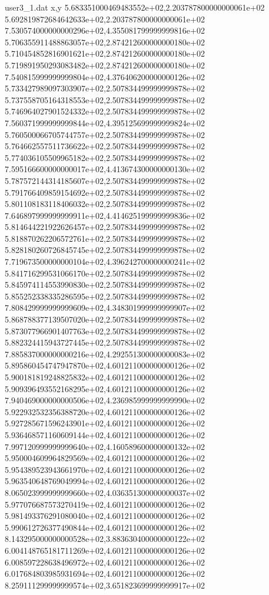 \begin{filecontents}{user3_1.dat}
x,y
5.683351000469483552e+02,2.203787800000000061e+02
5.692819872684642633e+02,2.203787800000000061e+02
7.530574000000000296e+02,4.355081799999999816e+02
5.706355911488863057e+02,2.874212600000000180e+02
5.710454852816901621e+02,2.874212600000000180e+02
5.719891950293083482e+02,2.874212600000000180e+02
7.540815999999999804e+02,4.376406200000000126e+02
5.733427989097303907e+02,2.507834499999999878e+02
5.737558705164318553e+02,2.507834499999999878e+02
5.746964027901524332e+02,2.507834499999999878e+02
7.560371999999999844e+02,4.395125699999999824e+02
5.760500066705744757e+02,2.507834499999999878e+02
5.764662557511736622e+02,2.507834499999999878e+02
5.774036105509965182e+02,2.507834499999999878e+02
7.595166600000000017e+02,4.413674300000000130e+02
5.787572144314185607e+02,2.507834499999999878e+02
5.791766409859154692e+02,2.507834499999999878e+02
5.801108183118406032e+02,2.507834499999999878e+02
7.646897999999999911e+02,4.414625199999999836e+02
5.814644221922626457e+02,2.507834499999999878e+02
5.818870262206572761e+02,2.507834499999999878e+02
5.828180260726845745e+02,2.507834499999999878e+02
7.719673500000000104e+02,4.396242700000000241e+02
5.841716299531066170e+02,2.507834499999999878e+02
5.845974114553990830e+02,2.507834499999999878e+02
5.855252338335286595e+02,2.507834499999999878e+02
7.808429999999999609e+02,4.348301999999999907e+02
5.868788377139507020e+02,2.507834499999999878e+02
5.873077966901407763e+02,2.507834499999999878e+02
5.882324415943727445e+02,2.507834499999999878e+02
7.885837000000000216e+02,4.292551300000000083e+02
5.895860454747947870e+02,4.601211000000000126e+02
5.900181819248825832e+02,4.601211000000000126e+02
5.909396493552168295e+02,4.601211000000000126e+02
7.940469000000000506e+02,4.236985999999999990e+02
5.922932532356388720e+02,4.601211000000000126e+02
5.927285671596243901e+02,4.601211000000000126e+02
5.936468571160609144e+02,4.601211000000000126e+02
7.997120999999999640e+02,4.160589600000000132e+02
5.950004609964829569e+02,4.601211000000000126e+02
5.954389523943661970e+02,4.601211000000000126e+02
5.963540648769049994e+02,4.601211000000000126e+02
8.065023999999999660e+02,4.036351300000000037e+02
5.977076687573270419e+02,4.601211000000000126e+02
5.981493376291080040e+02,4.601211000000000126e+02
5.990612726377490844e+02,4.601211000000000126e+02
8.143295000000000528e+02,3.883630400000000122e+02
6.004148765181711269e+02,4.601211000000000126e+02
6.008597228638496972e+02,4.601211000000000126e+02
6.017684803985931694e+02,4.601211000000000126e+02
8.259111299999999574e+02,3.651823699999999917e+02

\end{filecontents}
